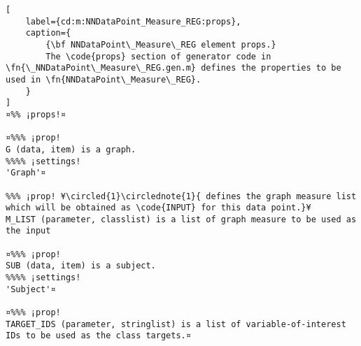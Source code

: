\documentclass{tufte-handout}
\begin{document}
\begin{lstlisting}[
	label={cd:m:NNDataPoint_Measure_REG:props},
	caption={
		{\bf NNDataPoint\_Measure\_REG element props.}
		The \code{props} section of generator code in \fn{\_NNDataPoint\_Measure\_REG.gen.m} defines the properties to be used in \fn{NNDataPoint\_Measure\_REG}.
	}
]
¤%% ¡props!¤

¤%%% ¡prop!  
G (data, item) is a graph.
%%%% ¡settings!
'Graph'¤

%%% ¡prop! ¥\circled{1}\circlednote{1}{ defines the graph measure list which will be obtained as \code{INPUT} for this data point.}¥
M_LIST (parameter, classlist) is a list of graph measure to be used as the input

¤%%% ¡prop!
SUB (data, item) is a subject.
%%%% ¡settings!
'Subject'¤

¤%%% ¡prop!
TARGET_IDS (parameter, stringlist) is a list of variable-of-interest IDs to be used as the class targets.¤

\end{lstlisting}

\clearpage
\end{document}
